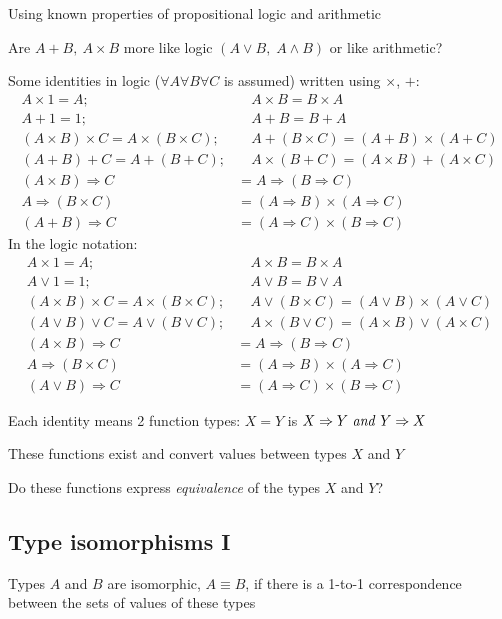 Using known properties of propositional logic and arithmetic

Are $A+B,\:A\times B$ more like logic $\left(A\vee B,\;A\wedge B\right)$
or like arithmetic?

Some identities in logic ($\forall A\forall B\forall C$ is assumed)
written using $\times$, $+$:
\begin{align*}
A\times1=A; & \quad A\times B=B\times A\\
A+1=1; & \quad A+B=B+A\\
(A\times B)\times C=A\times(B\times C); & \quad A+(B\times C)=(A+B)\times(A+C)\\
(A+B)+C=A+(B+C); & \quad A\times(B+C)=(A\times B)+(A\times C)\\
(A\times B)\Rightarrow C & =A\Rightarrow(B\Rightarrow C)\\
A\Rightarrow(B\times C) & =(A\Rightarrow B)\times(A\Rightarrow C)\\
(A+B)\Rightarrow C & =(A\Rightarrow C)\times(B\Rightarrow C)
\end{align*}
In the logic notation:
\begin{align*}
A\times1=A; & \quad A\times B=B\times A\\
A\vee1=1; & \quad A\vee B=B\vee A\\
(A\times B)\times C=A\times(B\times C); & \quad A\vee(B\times C)=(A\vee B)\times(A\vee C)\\
(A\vee B)\vee C=A\vee(B\vee C); & \quad A\times(B\vee C)=(A\times B)\vee(A\times C)\\
(A\times B)\Rightarrow C & =A\Rightarrow(B\Rightarrow C)\\
A\Rightarrow(B\times C) & =(A\Rightarrow B)\times(A\Rightarrow C)\\
(A\vee B)\Rightarrow C & =(A\Rightarrow C)\times(B\Rightarrow C)
\end{align*}

Each identity means 2 function types: $X=Y$ is $X\Rightarrow Y\text{ \emph{and} }Y\Rightarrow X$

These functions exist and convert values between types $X$ and $Y$

Do these functions express \emph{equivalence} of the types $X$ and
$Y$?

\subsection{Type isomorphisms I}

Types $A$ and $B$ are isomorphic, $A\equiv B$, if there is a 1-to-1
correspondence between the sets of values of these types

